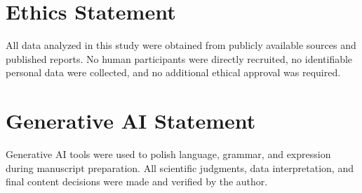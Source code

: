 \documentclass[preprint,authoryear]{elsarticle}
\begin{document}
\section*{Ethics Statement}
All data analyzed in this study were obtained from publicly available sources and published reports. No human participants were directly recruited, no identifiable personal data were collected, and no additional ethical approval was required.

\section*{Generative AI Statement}
Generative AI tools were used to polish language, grammar, and expression during manuscript preparation. All scientific judgments, data interpretation, and final content decisions were made and verified by the author.
\end{document}

